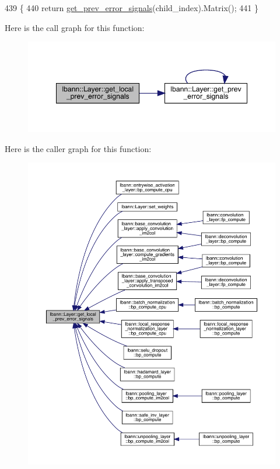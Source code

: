 \begin{DoxyCode}
439                                                         \{
440   \textcolor{keywordflow}{return} \hyperlink{classlbann_1_1Layer_a7ac4579d3c1671dfaf86e3b618d6938a}{get\_prev\_error\_signals}(child\_index).Matrix();
441 \}
\end{DoxyCode}
Here is the call graph for this function\+:\nopagebreak
\begin{figure}[H]
\begin{center}
\leavevmode
\includegraphics[width=348pt]{classlbann_1_1Layer_a82827edc5e869960144f3ccb2172bfcd_cgraph}
\end{center}
\end{figure}
Here is the caller graph for this function\+:\nopagebreak
\begin{figure}[H]
\begin{center}
\leavevmode
\includegraphics[width=350pt]{classlbann_1_1Layer_a82827edc5e869960144f3ccb2172bfcd_icgraph}
\end{center}
\end{figure}
\mbox{\label{classlbann_1_1Layer_af3490fe9011ef620b827970bc5dcc7a7}} 
